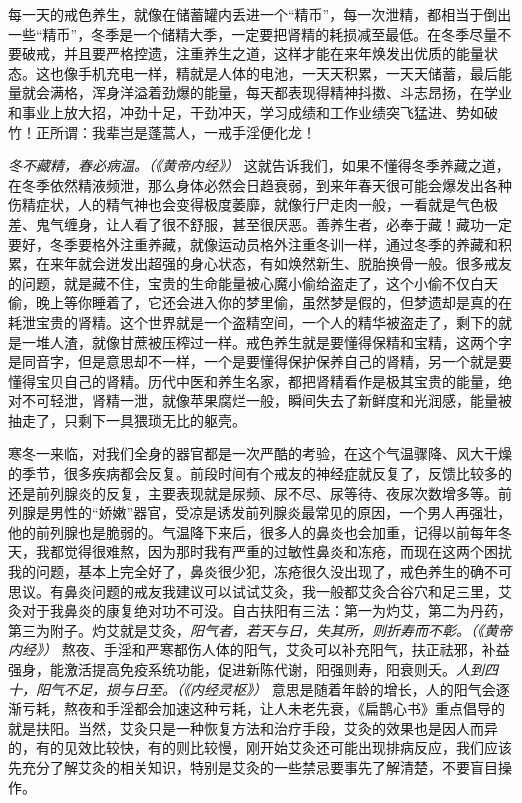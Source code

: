 每一天的戒色养生，就像在储蓄罐内丢进一个“精币”，每一次泄精，都相当于倒出一些“精币”，冬季是一个储精大季，一定要把肾精的耗损减至最低。在冬季尽量不要破戒，并且要严格控遗，注重养生之道，这样才能在来年焕发出优质的能量状态。这也像手机充电一样，精就是人体的电池，一天天积累，一天天储蓄，最后能量就会满格，浑身洋溢着劲爆的能量，每天都表现得精神抖擞、斗志昂扬，在学业和事业上放大招，冲劲十足，干劲冲天，学习成绩和工作业绩突飞猛进、势如破竹！正所谓：我辈岂是蓬蒿人，一戒手淫便化龙！

\textit{冬不藏精，春必病温。（《黄帝内经》）} 这就告诉我们，如果不懂得冬季养藏之道，在冬季依然精液频泄，那么身体必然会日趋衰弱，到来年春天很可能会爆发出各种伤精症状，人的精气神也会变得极度萎靡，就像行尸走肉一般，一看就是气色极差、鬼气缠身，让人看了很不舒服，甚至很厌恶。善养生者，必奉于藏！藏功一定要好，冬季要格外注重养藏，就像运动员格外注重冬训一样，通过冬季的养藏和积累，在来年就会迸发出超强的身心状态，有如焕然新生、脱胎换骨一般。很多戒友的问题，就是藏不住，宝贵的生命能量被心魔小偷给盗走了，这个小偷不仅白天偷，晚上等你睡着了，它还会进入你的梦里偷，虽然梦是假的，但梦遗却是真的在耗泄宝贵的肾精。这个世界就是一个盗精空间，一个人的精华被盗走了，剩下的就是一堆人渣，就像甘蔗被压榨过一样。戒色养生就是要懂得保精和宝精，这两个字是同音字，但是意思却不一样，一个是要懂得保护保养自己的肾精，另一个就是要懂得宝贝自己的肾精。历代中医和养生名家，都把肾精看作是极其宝贵的能量，绝对不可轻泄，肾精一泄，就像苹果腐烂一般，瞬间失去了新鲜度和光润感，能量被抽走了，只剩下一具猥琐无比的躯壳。

寒冬一来临，对我们全身的器官都是一次严酷的考验，在这个气温骤降、风大干燥的季节，很多疾病都会反复。前段时间有个戒友的神经症就反复了，反馈比较多的还是前列腺炎的反复，主要表现就是尿频、尿不尽、尿等待、夜尿次数增多等。前列腺是男性的“娇嫩”器官，受凉是诱发前列腺炎最常见的原因，一个男人再强壮，他的前列腺也是脆弱的。气温降下来后，很多人的鼻炎也会加重，记得以前每年冬天，我都觉得很难熬，因为那时我有严重的过敏性鼻炎和冻疮，而现在这两个困扰我的问题，基本上完全好了，鼻炎很少犯，冻疮很久没出现了，戒色养生的确不可思议。有鼻炎问题的戒友我建议可以试试艾灸，我一般都艾灸合谷穴和足三里，艾灸对于我鼻炎的康复绝对功不可没。自古扶阳有三法：第一为灼艾，第二为丹药，第三为附子。灼艾就是艾灸，\textit{阳气者，若天与日，失其所，则折寿而不彰。（《黄帝内经》）} 熬夜、手淫和严寒都伤人体的阳气，艾灸可以补充阳气，扶正祛邪，补益强身，能激活提高免疫系统功能，促进新陈代谢，阳强则寿，阳衰则夭。\textit{人到四十，阳气不足，损与日至。（《内经灵枢》）} 意思是随着年龄的增长，人的阳气会逐渐亏耗，熬夜和手淫都会加速这种亏耗，让人未老先衰，《扁鹊心书》重点倡导的就是扶阳。当然，艾灸只是一种恢复方法和治疗手段，艾灸的效果也是因人而异的，有的见效比较快，有的则比较慢，刚开始艾灸还可能出现排病反应，我们应该先充分了解艾灸的相关知识，特别是艾灸的一些禁忌要事先了解清楚，不要盲目操作。

